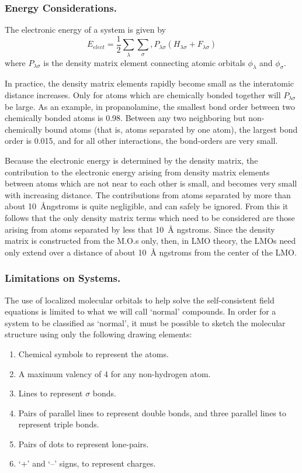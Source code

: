 \subsubsection{Energy Considerations.}
The electronic energy of a system is given by 
\begin{equation}
E_{elect} = \frac{1}{2}\sum_{\lambda}\sum_{\sigma},
P_{\lambda\sigma}(H_{\lambda\sigma}+F_{\lambda\sigma})
\end{equation}
where $P_{\lambda\sigma}$ is the density matrix element connecting atomic
orbitals $\phi_{\lambda}$ and $\phi_{\sigma}$.

In practice, the density matrix elements rapidly become small as the
interatomic distance increases.  Only for atoms which are chemically bonded
together will $P_{\lambda\sigma}$ be large.  As an example, in propanolamine,
the smallest bond order between two chemically bonded atoms is 0.98. Between
any two neighboring but non-chemically bound atoms (that is, atoms  separated
by one atom), the largest bond order is 0.015, and for all other  interactions,
the bond-orders are very small.

Because the electronic energy is determined by the density matrix, the
contribution to the electronic energy arising from density matrix elements
between atoms which  are not near to each other is small, and becomes very
small with increasing  distance.  The contributions from atoms separated by
more than about 10~\AA ngstroms is quite negligible, and can safely be
ignored.  From this it follows that the only density matrix terms which need to
be considered are those arising from atoms separated by less that 10~\AA
ngstroms.  Since the density matrix is constructed from the M.O.s only, then,
in LMO theory, the LMOs need only extend over a distance of about 10~\AA
ngstroms from the center of the LMO.  

\subsubsection{Limitations on Systems.}
The use of localized molecular orbitals to help solve the self-consistent
field equations is limited to what we will call `normal' compounds.  In
order for a system   to be classified as `normal', it must be possible to
sketch the molecular structure using only the following drawing elements:

\begin{enumerate}
\item Chemical symbols to represent the atoms.
\item A maximum valency of 4 for any non-hydrogen atom.
\item Lines to represent $\sigma$ bonds.
\item Pairs of parallel lines to represent double bonds, and three
parallel lines to represent triple bonds.
\item Pairs of dots to represent lone-pairs.
\item `+' and `--' signs, to represent charges.
\end{enumerate}

